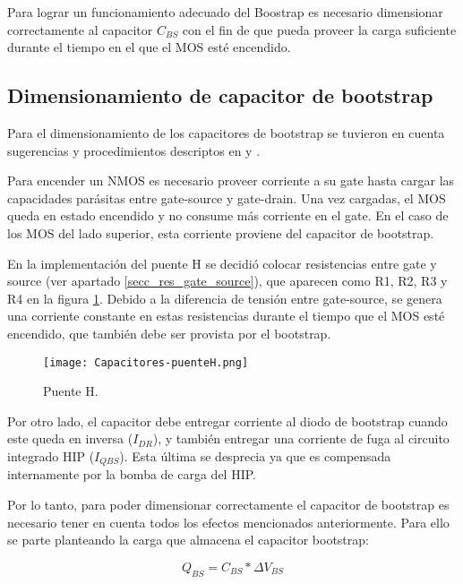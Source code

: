 \noindent Para lograr un funcionamiento adecuado del Boostrap es necesario dimensionar correctamente al capacitor $C_{BS}$ con el fin de que pueda proveer la carga suficiente durante el tiempo en el que el MOS esté encendido.


\subsection{Dimensionamiento de capacitor de bootstrap}

\noindent Para el dimensionamiento de los capacitores de bootstrap se tuvieron en cuenta sugerencias y procedimientos descriptos en \cite{HIP4081A_AN9405} y \cite{HIP4081A_FN3659}.

\noindent Para encender un NMOS es necesario proveer corriente a su gate hasta cargar las capacidades parásitas entre gate-source y gate-drain. Una vez cargadas, el MOS queda en estado encendido y no consume más corriente en el gate. En el caso de los MOS del lado superior, esta corriente proviene del capacitor de bootstrap. 

\noindent En la implementación del puente H se decidió colocar resistencias entre gate y source (ver apartado \ref{secc_res_gate_source}), que aparecen como R1, R2, R3 y R4 en la figura \ref{fig:img_capacitores-puenteH}. Debido a la diferencia de tensión entre gate-source, se genera una corriente constante en estas resistencias durante el tiempo que el MOS esté encendido, que también debe ser provista por el  bootstrap.

\begin{figure}[H]
	\centering
	\texttt{[image: Capacitores-puenteH.png]}
	\caption{Puente H.}
	\label{fig:img_capacitores-puenteH}
\end{figure}

\noindent Por otro lado, el capacitor debe entregar corriente al diodo de bootstrap cuando este queda en inversa ($I_{DR}$), y también entregar una corriente de fuga al circuito integrado HIP ($I_{QBS}$). Esta última se desprecia ya que es compensada internamente por la bomba de carga del HIP.

\noindent Por lo tanto, para poder dimensionar correctamente el capacitor de bootstrap es necesario tener en cuenta todos los efectos mencionados anteriormente. Para ello se parte planteando la carga que almacena el capacitor bootstrap:

\begin{equation} \label{eq_carga-cap-bootstrap}
Q_{BS}=C_{BS}*\Delta V_{BS}
\end{equation}

